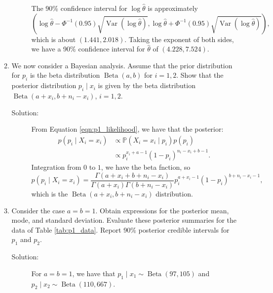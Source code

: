 \documentclass[letterpaper,11pt]{article}
\begin{document}
\begin{enumerate}
\begin{enumerate}
\begin{description}
      The 90\% confidence interval for $\log\hat{\theta}$ is approximately
      \begin{equation}
        \left(
          \log\hat{\theta} -
          \Phi^{-1}\left(0.95\right)
          \sqrt{\operatorname{Var}\left(\log\hat{\theta}\right)},
          \log\hat{\theta} +
          \Phi^{-1}\left(0.95\right)
          \sqrt{\operatorname{Var}\left(\log\hat{\theta}\right)}
        \right),
      \end{equation}
      which is about $\left(1.441, 2.018\right)$. Taking the exponent of both
      sides, we have a 90\% confidence interval for $\hat{\theta}$ of
      $\boxed{\left(4.228, 7.524\right).}$
    \end{description}
  \item We now consider a Bayesian analysis. Assume that the prior distribution
    for $p_i$ is the beta distribution $\operatorname{Beta}\left(a, b\right)$
    for $i = 1, 2$. Show that the posterior distribution $p_i \mid x_i$ is given
    by the beta distribution $\operatorname{Beta}\left(a + x_i, b + n_i - x_i\right)$,
    $i=1,2$.
    \begin{description}
    \item[Solution:] From Equation \ref{eqn:p1_likelihood}, we have that the
      posterior:
      \begin{align*}
        p\left(p_i \mid X_i = x_i\right)
        &\propto \mathbb{P}\left(X_i = x_i \mid p_i\right)p\left(p_i\right) \\
        &\propto p_i^{x_i + a - 1}\left(1 - p_i\right)^{n_i - x_i + b - 1}.
      \end{align*}
      Integration from $0$ to $1$, we have the beta fnction, so
      \begin{equation}
        p\left(p_i \mid X_i = x_i\right)
        = \frac{\Gamma\left(a + x_i + b + n_i - x_i\right)}{\Gamma\left(a + x_i\right)\Gamma\left(b + n_i - x_i\right)}p_i^{a + x_i - 1}\left(1 - p_i\right)^{b + n_i - x_i - 1},
      \end{equation}
      which is the $\operatorname{Beta}\left(a + x_i, b + n_i - x_i\right)$
      distribution.
    \end{description}
  \item Consider the case $a = b = 1$. Obtain expressions for the posterior
    mean, mode, and standard deviation. Evaluate these posterior summaries for
    the data of Table \ref{tab:p1_data}. Report 90\% posterior credible
    intervals for $p_1$ and $p_2$.

    \begin{description}
    \item[Solution:] For $a = b = 1$, we have that
      $p_1 \mid x_1 \sim \operatorname{Beta}\left(97, 105\right)$ and
      $p_2 \mid x_2 \sim \operatorname{Beta}\left(110, 667\right)$.


\end{description}
\end{enumerate}
\end{enumerate}
\end{document}
